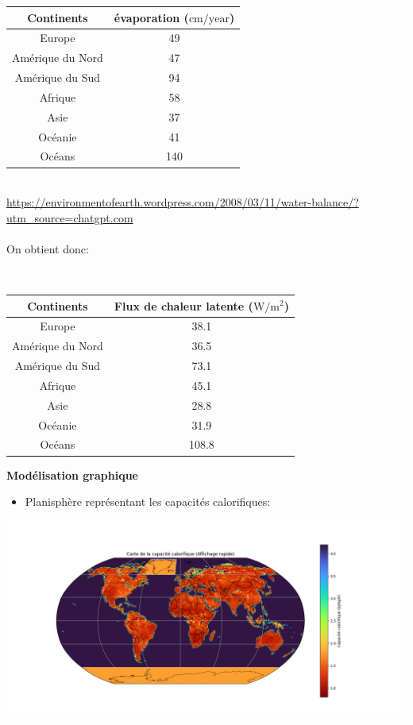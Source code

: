\documentclass[a4paper,12pt]{article}
\begin{document}
\begin{tabular}{|c|c|}
\hline
Continents & évaporation ($\mathrm{cm/year}$) \\
\hline
Europe & 49 \\
\hline
Amérique du Nord & 47 \\
\hline
Amérique du Sud & 94 \\
\hline
Afrique & 58 \\
\hline
Asie & 37 \\
\hline
Océanie & 41 \\
\hline
Océans & 140 \\
\hline
\end{tabular}
\\
\url{https://environmentofearth.wordpress.com/2008/03/11/water-balance/?utm_source=chatgpt.com}
\\
\\
On obtient donc:

\\
\begin{tabular}{|c|c|}
\hline
Continents & Flux de chaleur latente ($\mathrm{W/m^2}$) \\
\hline
Europe & 38.1 \\
\hline
Amérique du Nord & 36.5 \\
\hline
Amérique du Sud & 73.1 \\
\hline
Afrique & 45.1 \\
\hline
Asie & 28.8 \\
\hline
Océanie & 31.9 \\
\hline
Océans & 108.8 \\
\hline
\end{tabular}

\textbf{Modélisation graphique}

\begin{itemize}
    \item Planisphère représentant les capacités calorifiques: 
\end{itemize}
\includegraphics[width=1.0\linewidth]{modele4/figures/c_humidite.png}
\end{document}
